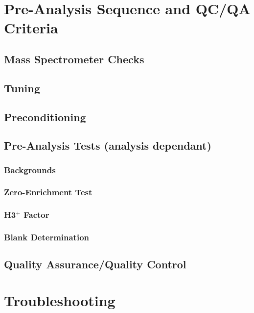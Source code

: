 \documentclass[12pt]{../SOP3}\usepackage[]{graphicx}\usepackage[]{color}
\begin{document}
\newpage

\section{Pre-Analysis Sequence and QC/QA Criteria}

\subsection{Mass Spectrometer Checks}

\subsection{Tuning}

\subsection{Preconditioning}

\subsection{Pre-Analysis Tests (analysis dependant)}

\subsubsection{Backgrounds}

\subsubsection{Zero-Enrichment Test}

\subsubsection{H3$^+$ Factor}

\subsubsection{Blank Determination}

\subsection{Quality Assurance/Quality Control}

\section{Troubleshooting}
\end{document}

